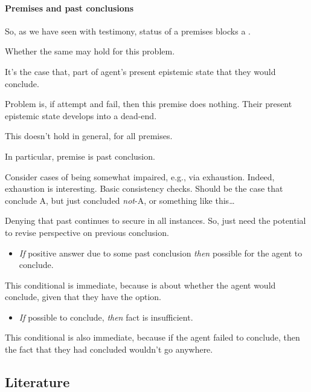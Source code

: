 \paragraph{Premises and past conclusions}

\begin{note}[Premises]
  So, as we have seen with testimony, status of a premises blocks a \requ{}.

  Whether the same may hold for this problem.

  It's the case that, part of agent's present epistemic state that they would conclude.

  Problem is, if attempt and fail, then this premise does nothing.
  Their present epistemic state develops into a dead-end.
\end{note}

\begin{note}[Note!]
  This doesn't hold in general, for all premises.

  In particular, premise is past conclusion.

  Consider cases of being somewhat impaired, e.g., via exhaustion.
  Indeed, exhaustion is interesting.
  Basic consistency checks.
  Should be the case that conclude A, but just concluded \emph{not}-A, or something like this\dots

  Denying that past continues to secure in all instances.
  So, just need the potential to revise perspective on previous conclusion.
\end{note}

\begin{note}
  \begin{itemize}
  \item
    \emph{If} positive answer due to some past conclusion \emph{then} possible for the agent to conclude.
  \end{itemize}
  This conditional is immediate, because \qzS{} is about whether the agent would conclude, given that they have the option.
  \begin{itemize}
  \item
    \emph{If} possible to conclude, \emph{then} fact is insufficient.
  \end{itemize}
  This conditional is also immediate, because if the agent failed to conclude, then the fact that they had concluded wouldn't go anywhere.
\end{note}


\subsection{Literature}
\label{sec:literature}

